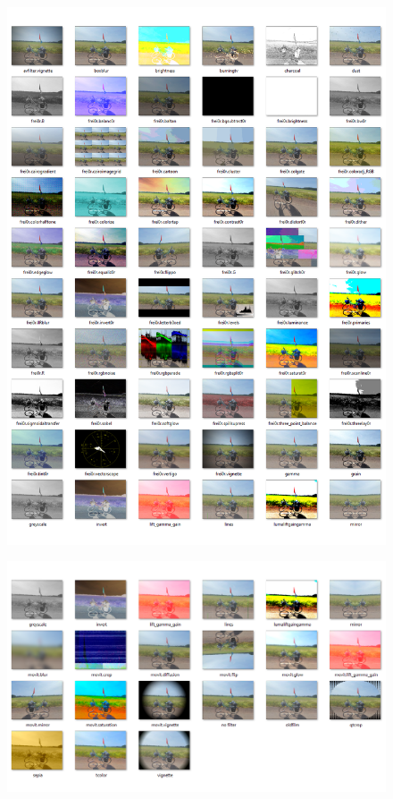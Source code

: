\documentclass[../MasterThesis.tex]{subfiles}
\begin{document}
\begin{figure}[H]
	\includegraphics[width=1\textwidth]{Seite2.png}
\end{figure}

\begin{figure}[H]
	\includegraphics[width=1\textwidth]{Seite3.png}
\end{figure}





	
	
\end{document}
